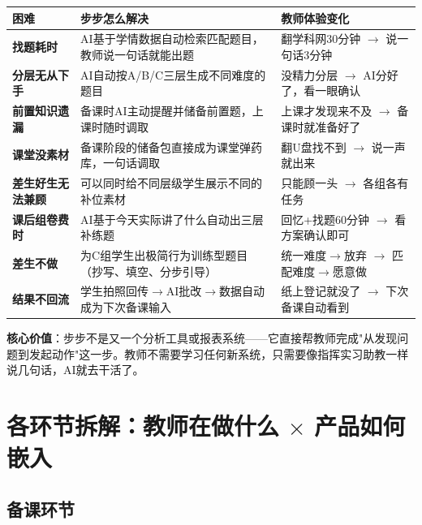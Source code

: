 \documentclass[11pt,a4paper]{article}
\begin{document}
\begin{center}\small
\begin{tabularx}{\textwidth}{>{\bfseries}l Y Y}
\toprule
{}\textbf{困难} & \textbf{步步怎么解决} & \textbf{教师体验变化} \\
\midrule
找题耗时 & AI基于学情数据自动检索匹配题目，教师说一句话就能出题 & 翻学科网30分钟 $\rightarrow$ 说一句话3分钟 \\
分层无从下手 & AI自动按A/B/C三层生成不同难度的题目 & 没精力分层 $\rightarrow$ AI分好了，看一眼确认 \\
前置知识遗漏 & 备课时AI主动提醒并储备前置题，上课时随时调取 & 上课才发现来不及 $\rightarrow$ 备课时就准备好了 \\
课堂没素材 & 备课阶段的储备包直接成为课堂弹药库，一句话调取 & 翻U盘找不到 $\rightarrow$ 说一声就出来 \\
差生好生无法兼顾 & 可以同时给不同层级学生展示不同的补位素材 & 只能顾一头 $\rightarrow$ 各组各有任务 \\
课后组卷费时 & AI基于今天实际讲了什么自动出三层补练题 & 回忆+找题60分钟 $\rightarrow$ 看方案确认即可 \\
差生不做 & 为C组学生出极简行为训练型题目（抄写、填空、分步引导） & 统一难度$\rightarrow$放弃 $\rightarrow$ 匹配难度$\rightarrow$愿意做 \\
结果不回流 & 学生拍照回传$\rightarrow$AI批改$\rightarrow$数据自动成为下次备课输入 & 纸上登记就没了 $\rightarrow$ 下次备课自动看到 \\
\bottomrule
\end{tabularx}
\end{center}

\begin{notebox}
\textbf{核心价值}：步步不是又一个分析工具或报表系统——它直接帮教师完成"从发现问题到发起动作"这一步。教师不需要学习任何新系统，只需要像指挥实习助教一样说几句话，AI就去干活了。
\end{notebox}

\section{各环节拆解：教师在做什么 $\times$ 产品如何嵌入}

\subsection{备课环节}
\end{document}
